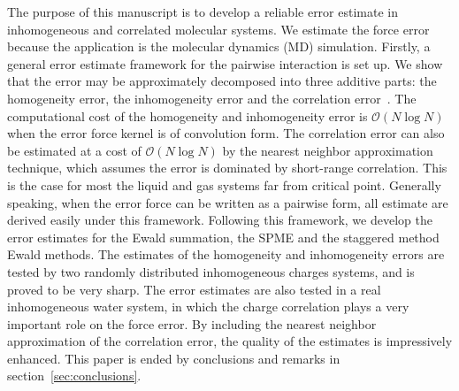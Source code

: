 \documentclass[aps,pre,preprint,unsortedaddress]{revtex4}
\newcommand{\recheck}[1]{{\color{red} #1}}
\newcommand{\redc}[1]{{\color{red} #1}}
\begin{document}
The purpose of this manuscript is to develop a reliable  error
estimate in inhomogeneous and correlated molecular systems.
We estimate the force error because the application is the molecular
dynamics (MD) simulation.  Firstly, a general error estimate
framework for the pairwise interaction is set up.
\recheck{We show that the
  error may be approximately
  decomposed into three additive parts: the homogeneity error,
the inhomogeneity error and the correlation error~\cite{wang2012}.}
The computational cost of the homogeneity and inhomogeneity
error is $\mathcal O(N\log N)$ when the error force kernel is
of convolution form.
The  correlation error can also be
estimated at a cost of $\mathcal O(N\log N)$
by the nearest neighbor approximation
technique, which \redc{assumes} the error  is dominated by  short-range correlation.
This
is the case for most the liquid and gas systems far from critical point.
Generally speaking,
when the error force can be written as a pairwise form, 
all estimate are derived easily under this framework.
Following this framework, we
develop the error estimates for the Ewald summation, the SPME 
and the staggered method Ewald methods.   The estimates
of the homogeneity and inhomogeneity errors are tested by two
randomly distributed inhomogeneous charges systems,
and is proved to
be very sharp.
The error estimates are also tested in a real inhomogeneous water system,
in which the charge correlation plays a very important role
on the force error. By 
including the nearest neighbor approximation of
\redc{the} correlation error, the quality of the estimates
is impressively enhanced.
This paper is ended by conclusions and remarks in
section~\ref{sec:conclusions}.


\end{document}
